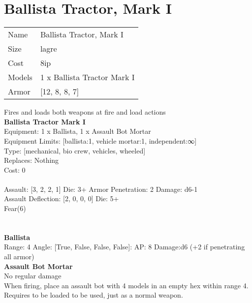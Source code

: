 \pagebreak\pagebreak

\section{ Ballista Tractor, Mark I }

\begin{tabular}{ll}
  Name & Ballista Tractor, Mark I \\
  Size & lagre\\
  Cost & 8ip\\
  Models & 1 x Ballista Tractor Mark I\\
  Armor & [12, 8, 8, 7]\\
\end{tabular}

\noindent Fires and loads both weapons at fire and load actions\\ 


{\bf Ballista Tractor Mark I } \\
Equipment: 1 x Ballista, 1 x Assault Bot Mortar \\
Equipment Limits: [ballista:1, vehicle mortar:1, independent:∞] \\
Type: [mechanical, bio crew, vehicles, wheeled] \\
Replaces: Nothing \\
Cost: 0\\
\ \\
Assault: [3, 2, 2, 1] Die: 3+ Armor Penetration: 2 Damage: d6-1 \\
Assault Deflection: [2, 0, 0, 0] Die: 5+\\
\indent Fear(6)\\ 
 
\ \\

\ \\
{\bf Ballista } \\



Range: 4  Angle: [True, False, False, False]: AP: 8 Damage:d6 (+2 if penetrating all armor) \\




{\bf Assault Bot Mortar } \\

No regular damage\\ 
When firing, place an assault bot with 4 models in an empty hex within range 4. Requires to be loaded to be used, just as a normal weapon.\\ 





